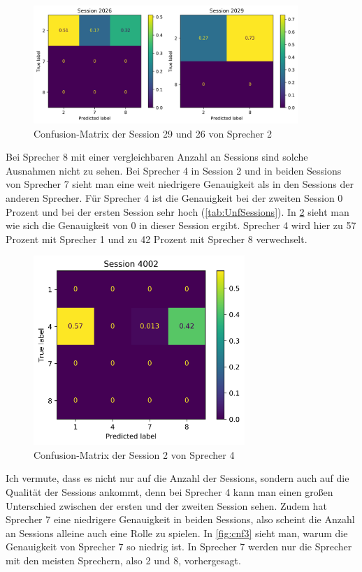 \begin{figure}[H]
  \centering
  \includegraphics[width=100mm ,scale=0.6]{UserConfMatUser2Unf.png}
  \caption{Confusion-Matrix der Session 29 und 26 von Sprecher 2}
  \label{fig:cnf1}
\end{figure}

Bei Sprecher 8 mit einer vergleichbaren Anzahl an Sessions sind solche Ausnahmen nicht zu sehen.
Bei Sprecher 4 in Session 2 und in beiden Sessions von Sprecher 7 sieht man eine weit niedrigere Genauigkeit als in den Sessions der anderen Sprecher. Für Sprecher 4 ist die Genauigkeit bei der zweiten Session 0 Prozent und bei der ersten Session sehr hoch (\ref{tab:UnfSessions}). In \ref{fig:cnf2} sieht man wie sich die Genauigkeit von 0 in dieser Session ergibt. Sprecher 4 wird hier zu 57 Prozent mit Sprecher 1 und zu 42 Prozent mit Sprecher 8 verwechselt.

\begin{figure}[H]
  \centering
  \includegraphics[width=80mm ,scale=0.6]{userCrossSessionUnf/Session 4002Unf.png}
  \caption{Confusion-Matrix der Session 2 von Sprecher 4}
  \label{fig:cnf2}
\end{figure}

Ich vermute, dass es nicht nur auf die Anzahl der Sessions, sondern auch auf die Qualität der Sessions ankommt, denn bei Sprecher 4 kann man einen großen Unterschied zwischen der ersten und der zweiten Session sehen. Zudem hat Sprecher 7 eine niedrigere Genauigkeit in beiden Sessions, also scheint die Anzahl an Sessions alleine auch eine Rolle zu spielen. In \ref{fig:cnf3} sieht man, warum die Genauigkeit von Sprecher 7 so niedrig ist. In Sprecher 7 werden nur die Sprecher mit den meisten Sprechern, also 2 und 8, vorhergesagt.

